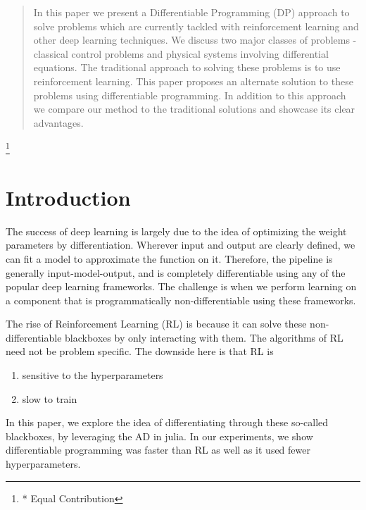 \documentclass{juliacon}
\begin{document}


\maketitle

\begin{abstract}
In this paper we present a Differentiable Programming (DP) approach to solve problems which are currently tackled with reinforcement learning and other deep learning techniques. We discuss two major classes of problems - classical control problems and physical systems involving differential equations. The traditional approach to solving these problems is to use reinforcement learning. This paper proposes an alternate solution to these problems using differentiable programming. In addition to this approach we compare our method to the traditional solutions and showcase its clear advantages.

\headingtable

\end{abstract}

\let\thefootnote\relax\footnote{* Equal Contribution}

\section{Introduction}
\label{intro}

The success of deep learning is largely due to the idea of optimizing the weight parameters by differentiation. Wherever input and output are clearly defined, we can fit a model to approximate the function on it. Therefore, the pipeline is generally input-model-output, and is completely differentiable using any of the popular deep learning frameworks. The challenge is when we perform learning on a component that is programmatically non-differentiable using these frameworks.

The rise of Reinforcement Learning (RL) is because it can solve these non-differentiable blackboxes by only interacting with them. The algorithms of RL need not be problem specific. The downside here is that RL is

\begin{enumerate}
    \item sensitive to the hyperparameters
    \item slow to train
\end{enumerate}

In this paper, we explore the idea of differentiating through these so-called blackboxes, by leveraging the AD in julia\cite{bezanson2017julia}. In our experiments, we show differentiable programming was faster than RL as well as it used fewer hyperparameters. 
\end{document}
